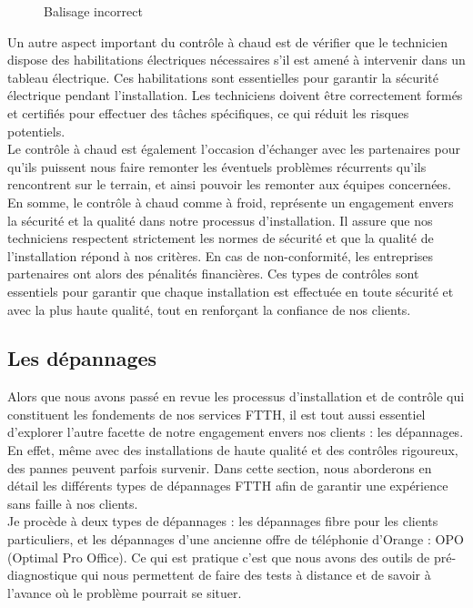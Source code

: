 \documentclass[12pt, a4paper]{article}
\begin{document}
\begin{figure}[htbp]
\begin{minipage}[b]{0.4\textwidth}
      \caption{Balisage incorrect}
    \end{minipage}
\end{figure}

Un autre aspect important du contrôle à chaud est
de vérifier que le technicien dispose des
habilitations électriques nécessaires s'il
est amené à intervenir dans un tableau
électrique. Ces habilitations sont essentielles
pour garantir la sécurité électrique pendant
l'installation. Les techniciens doivent être
correctement formés et certifiés pour effectuer
des tâches spécifiques, ce qui réduit les
risques potentiels.\\

Le contrôle à chaud est également l'occasion
d'échanger avec les partenaires pour qu'ils 
puissent nous faire remonter les éventuels
problèmes récurrents qu'ils rencontrent sur le terrain, 
et ainsi pouvoir les remonter aux équipes concernées.\\

En somme, le contrôle à chaud comme à froid,
représente un engagement envers la sécurité et la qualité
dans notre processus d'installation. Il assure
que nos techniciens respectent strictement
les normes de sécurité et que la qualité de
l'installation répond à nos critères.
En cas de non-conformité, les entreprises 
partenaires ont alors des pénalités financières.
Ces types de contrôles sont essentiels pour garantir
que chaque installation est
effectuée en toute sécurité et avec la plus
haute qualité, tout en renforçant la confiance
de nos clients.


\newpage
\subsection{Les dépannages}
Alors que nous avons passé en revue les processus d'installation et
de contrôle qui constituent les fondements de nos services FTTH,
il est tout aussi essentiel d'explorer l'autre
facette de notre engagement envers nos clients : les dépannages.
En effet, même avec des installations de haute qualité et des
contrôles rigoureux, des pannes peuvent parfois survenir.
Dans cette section, nous aborderons en détail
les différents types de dépannages FTTH afin de garantir une expérience sans
faille à nos clients.\\

Je procède à deux types de dépannages : les dépannages fibre pour les 
clients particuliers, et les dépannages d'une ancienne offre de téléphonie 
d'Orange : OPO (Optimal Pro Office). Ce qui est pratique c'est que nous 
avons des outils de pré-diagnostique qui nous permettent de faire des tests
à distance et de savoir à l'avance où le problème pourrait se situer.
\end{document}
